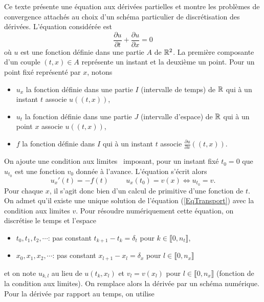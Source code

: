 Ce texte présente une équation aux dérivées partielles et montre les problèmes de convergence attachés au choix d'un schéma particulier de discrétisation des dérivées. L'équation considérée est
\begin{equation}
 \frac{\partial u}{\partial t} + \frac{\partial u}{\partial x} = 0 \label{EqTransport}
\end{equation}
où $u$ est une fonction définie dans une partie $A$ de $\mathbb{R}^2$. La première composante d'un couple $(t,x)\in A$ représente un instant et la deuxième un point.\newline
Pour un point fixé représenté par $x$, notons 
\begin{itemize}
 \item $u_x$ la fonction définie dans une partie $I$ (intervalle de temps) de $\mathbb{R}$ qui à un instant $t$ associe $u((t,x))$,  
 \item $u_t$ la fonction définie dans une partie $J$ (intervalle d'espace) de $\mathbb{R}$ qui à un point $x$ associe $u((t,x))$,  
 \item $f$ la fonction définie dans $I$ qui à un instant $t$ associe $\frac{\partial u}{\partial x}((t,x))$.
\end{itemize}
On ajoute une \og condition aux limites\fg~ imposant, pour un instant fixé $t_0=0$ que $u_{t_0}$ est une fonction $v_0$ donnée à l'avance. L'équation s'écrit alors
\[
 u_x'(t) = -f(t) \hspace{1cm} u_x(t_0) = v(x) \Leftrightarrow u_{t_0}=v.
\]
Pour chaque $x$, il s'agit donc bien d'un calcul de primitive d'une fonction de $t$.\newline
On admet qu'il existe une unique solution de l'équation (\ref{EqTransport}) avec la condition aux limites $v$.\newline
Pour résoudre numériquement cette équation, on discrétise le temps et l'espace
\begin{itemize}
 \item $t_0, t_1, t_2, \cdots $: pas constant $t_{k+1} - t_k = \delta_t$ pour $k\in \llbracket 0, n_t \rrbracket$,
 \item $x_0, x_1, x_2, \cdots$:  pas constant $x_{l+1} - x_l = \delta_x$ pour $l\in \llbracket 0, n_x \rrbracket$
\end{itemize}
et on note $u_{k,l}$ au lieu de $u(t_k,x_l)$ et $v_l = v(x_l)$ pour $l\in \llbracket 0, n_x\rrbracket$ (fonction de la condition aux limites). On remplace alors la dérivée par un schéma numérique.\newline
Pour la dérivée par rapport au temps, on utilise
